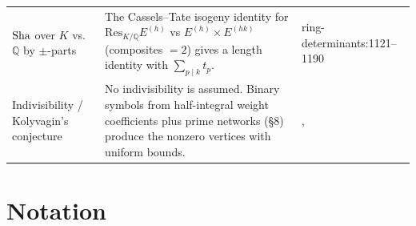 \documentclass[11pt]{article}
\theoremstyle{remark}
\newcommand{\Q}{\mathbb Q}
\newcommand{\Sha}{\text{\rm Sha}}
\newcommand{\src}[2]{\textsf{\small #1:#2}}
\begin{document}
{\begin{longtable}{@{}P{0.25\textwidth}P{0.49\textwidth}P{0.19\textwidth}@{}}
$\Sha$ over $K$ vs.\ $\Q$ by $\pm$-parts &
 The Cassels--Tate isogeny identity for $\mathrm{Res}_{K/\Q}E^{(h)}$ vs
 $E^{(h)}\times E^{(hk)}$ (composites $=2$) gives a length identity with
 $\sum_{p\mid k}t_p$. &
 \src{ring-determinants}{1121--1190} \\
Indivisibility / Kolyvagin's conjecture &
 No indivisibility is assumed. Binary symbols from half-integral weight
 coefficients plus prime networks (\S8) produce the nonzero vertices
 with uniform bounds. &
 ,  \\
\bottomrule
\end{longtable}}

\section{Notation}
\label{sec:notation}
\end{document}
